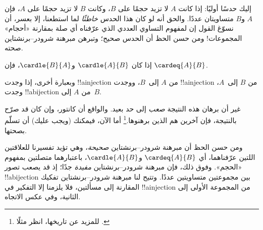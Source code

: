 \documentclass[../../../include/open-logic-section]{subfiles}
\begin{document}


\begin{explain}
إليك حدسًا أوليًا: إذا كانت $A$ لا تزيد حجمًا على $B$، وكانت $B$ لا
تزيد حجمًا على $A$، فإن $A$ و$B$ متساويتان عددًا. والحق أنه لو كان
هذا الحدس \emph{خاطئًا} لما استطعنا، إلا بعسر، أن نسوّغ القول إن لمفهوم
التساوي العددي الذي عرّفناه أي صلة بمقارنة «أحجام» المجموعات!{} ومن حسن
الحظ أن الحدس صحيح؛ وتبرهن مبرهنة شرودر–برنشتاين صحته.
\end{explain}

\begin{thm}
  إذا كان $\cardle{A}{B}$ و$\cardle{B}{A}$،
  فإن $\cardeq{A}{B}$.
\end{thm}

\begin{explain}
وبعبارة أخرى، إذا وجدت !!a{injection} من $A$ إلى~$B$، ووجدت
!!a{injection} من $B$ إلى~$A$، وجدت !!a{bijection} من $A$
إلى~$B$.

غير أن برهان هذه النتيجة \emph{صعب} إلى حد بعيد. والواقع أن كانتور،
وإن كان قد صرّح بالنتيجة، فإن آخرين هم الذين برهنوها.\footnote{للمزيد
عن تاريخها، انظر مثلًا \citet[ص~165--6]{Potter2004}.}
%
أما الآن، فيمكنك (ويجب عليك) أن تسلّم بصحتها.

ومن حسن الحظ أن مبرهنة شرودر–برنشتاين \emph{صحيحة}، وهي تؤيد تفسيرنا
للعلاقتين اللتين عرّفناهما، أي
$\cardeq{A}{B}$ و$\cardle{A}{B}$، باعتبارهما متصلتين بمفهوم «الحجم».
وفوق ذلك، فإن مبرهنة شرودر–برنشتاين \emph{مفيدة} جدًا؛ إذ قد يصعب تصور
!!a{bijection} بين مجموعتين متساويتين عددًا. وتتيح لنا مبرهنة
شرودر–برنشتاين تفكيك المقارنة إلى مسألتين، فلا يلزمنا إلا التفكير في
!!a{injection} من المجموعة الأولى إلى الثانية، وفي عكس الاتجاه.
\end{explain}
\end{document}
